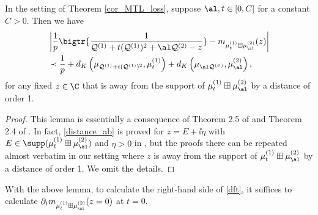 \documentclass[aos,preprint]{imsart}
\newcommand{\Qa}{\mathcal Q^{(1)}}
\newcommand{\Qb}{\mathcal Q^{(2)}}
\newcommand{\mua}{\mu^{(1)}}
\newcommand{\mub}{\mu^{(2)}}
\begin{document}
\begin{lemma}\label{lem_distance_ab}
In the setting of Theorem \ref{cor_MTL_loss}, suppose $\al, t \in [0,C]$ for a constant $C>0$. Then we have
\begin{align}
& \left|\frac{1}{p}\bigtr{\frac{1}{\Qa+t(\Qa)^2 + \al \Qb-z}} - m_{\mua_t\boxplus \mub_\al}(z)\right| \nonumber\\
& \prec \frac1p+ d_K\left( \mu_{\Qa+t(\Qa)^2},\mu^{(1)}_t\right) + d_K\left( \mu_{\al\cal Q^{(2)}},\mu_\al^{(2)}\right) ,\label{distance_ab}
 \end{align}
for any fixed $z\in \C$ that is away from the support of $\mua_t\boxplus \mub_\al$ by a distance of order 1. 
\end{lemma}
\begin{proof}
This lemma is essentially a consequence of Theorem 2.5 of \cite{BES_free1} and Theorem 2.4 of \cite{BES_free2}. 
In fact, \eqref{distance_ab} is proved for $z=E+\ii\eta$ with $E\in \supp(\mua_t\boxplus \mub_\al)$ and $\eta>0$ in \cite{BES_free2}, but the proofs there can be repeated almost verbatim in our setting where $z$ is away from the support of $\mua_t\boxplus \mub_\al$ by a distance of order 1. We omit the details. 
\end{proof}
  
 With the above lemma, to calculate the right-hand side of \eqref{dft}, it suffices to calculate $\partial_t m_{\mua_t\boxplus \mub_\al}(z=0)$ at $t=0$. 
  
\end{document}
